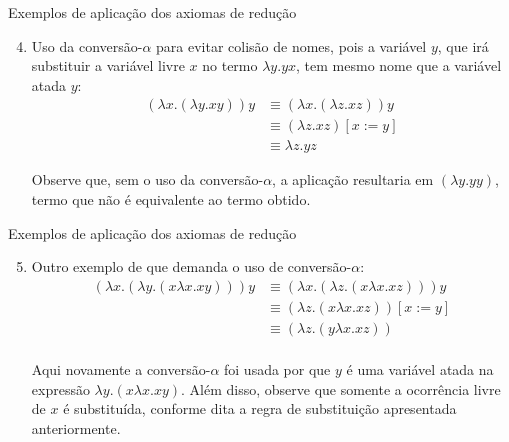 \begin{frame}[fragile]{Exemplos de aplicação dos axiomas de redução}

    \begin{enumerate}
        \setcounter{enumi}{3}
        \item Uso da conversão-$\alpha$ para evitar colisão de nomes, pois a variável $y$, que
        irá substituir a variável livre $x$ no termo $\lambda y.yx$, tem mesmo nome que a
        variável atada $y$:
        \begin{align*}
            (\lambda x.(\lambda y.xy))y & \equiv (\lambda x.(\lambda z.xz))y \\
            & \equiv (\lambda z.xz)[x:=y] \\
            & \equiv \lambda z.yz
        \end{align*}

        Observe que, sem o uso da conversão-$\alpha$, a aplicação resultaria em $(\lambda y.yy)$,
        termo que não é equivalente ao termo obtido.

    \end{enumerate}

\end{frame}

\begin{frame}[fragile]{Exemplos de aplicação dos axiomas de redução}

    \begin{enumerate}
        \setcounter{enumi}{4}
        \item Outro exemplo de que demanda o uso de conversão-$\alpha$:
        \begin{align*}
            (\lambda x.(\lambda y.(x\lambda x.xy)))y &\equiv (\lambda x.(\lambda z.(x\lambda x.xz)))y\\
            &\equiv (\lambda z.(x\lambda x.xz))[x:=y]\\
            &\equiv (\lambda z.(y\lambda x.xz))\\
        \end{align*}

        Aqui novamente a conversão-$\alpha$ foi usada por que $y$ é uma variável atada na
        expressão $\lambda y.(x\lambda x.xy)$. Além disso, observe que somente a ocorrência
        livre de $x$ é substituída, conforme dita a regra de substituição apresentada 
        anteriormente.
    \end{enumerate}

\end{frame}

